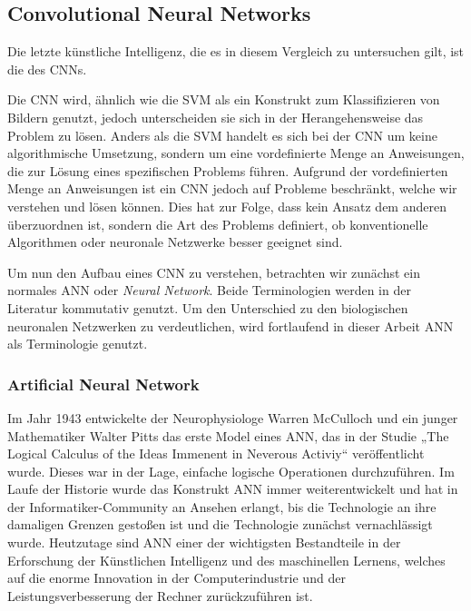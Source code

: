 
\subsection{Convolutional Neural Networks} \label{ssec:cnn}
Die letzte künstliche Intelligenz, die es in diesem Vergleich zu untersuchen gilt, ist die des \acp{CNN}.

Die CNN wird, ähnlich wie die SVM als ein Konstrukt zum Klassifizieren von Bildern genutzt, jedoch unterscheiden sie sich in der Herangehensweise das Problem zu lösen. Anders als die SVM handelt es sich bei der CNN um keine algorithmische Umsetzung, sondern um eine vordefinierte Menge an Anweisungen, die zur Lösung eines spezifischen Problems führen. Aufgrund der vordefinierten Menge an Anweisungen ist ein CNN jedoch auf Probleme beschränkt, welche wir verstehen und lösen können. Dies hat zur Folge, dass kein Ansatz dem anderen überzuordnen ist, sondern die Art des Problems definiert, ob konventionelle Algorithmen oder neuronale Netzwerke besser geeignet sind. \cite*{10.1007/978-3-319-45378-1_1}

Um nun den Aufbau eines CNN zu verstehen, betrachten wir zunächst ein normales \ac{ANN} oder \textit{Neural Network}. Beide Terminologien werden in der Literatur kommutativ genutzt. Um den Unterschied zu den biologischen neuronalen Netzwerken zu verdeutlichen, wird fortlaufend in dieser Arbeit ANN als Terminologie genutzt.

\subsubsection{Artificial Neural Network}
Im Jahr 1943 entwickelte der Neurophysiologe Warren McCulloch und ein junger Mathematiker Walter Pitts das erste Model eines ANN, das in der Studie „The Logical Calculus of the Ideas Immenent in Neverous Activiy“ veröffentlicht wurde. Dieses war in der Lage, einfache logische Operationen durchzuführen.
Im Laufe der Historie wurde das Konstrukt ANN immer weiterentwickelt und hat in der Informatiker-Community an Ansehen erlangt, bis die Technologie an ihre damaligen Grenzen gestoßen ist und die Technologie zunächst vernachlässigt wurde.
Heutzutage sind ANN einer der wichtigsten Bestandteile in der Erforschung der Künstlichen Intelligenz und des maschinellen Lernens, welches auf die enorme Innovation in der Computerindustrie und der Leistungsverbesserung der Rechner zurückzuführen ist. \cite*{10.1007/978-3-319-45378-1_1}

